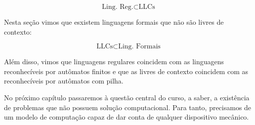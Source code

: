 \begin{displaymath}
  \textrm{Ling. Reg.} \subset \textrm{LLCs}
\end{displaymath}

Nesta seção vimos que esxistem linguagens formais que não são livres de contexto:

\begin{displaymath}
  \textrm{LLCs} \subset \textrm{Ling. Formais}
\end{displaymath}

Além disso, vimos que linguagens regulares coincidem com as linguagens reconhecíveis por autômatos finitos e que as livres de contexto coincidem com as reconhecíveis por autômatos com pilha.

No próximo capítulo passaremos à questão central do curso, a saber, a existência de problemas que não possuem solução computacional.
Para tanto, precisamos de um modelo de computação capaz de dar conta de qualquer dispositivo mecânico.

